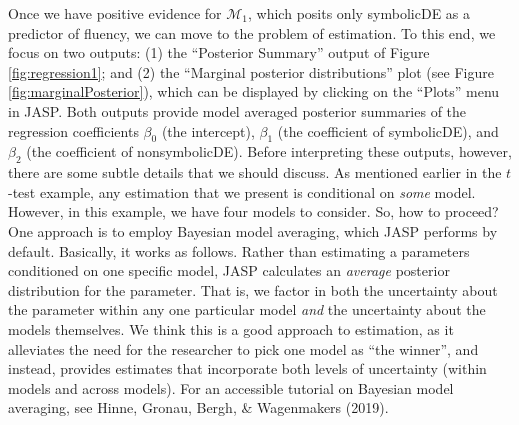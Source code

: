 \documentclass[english,,doc,floatsintext]{apa6}
\begin{document}
Once we have positive evidence for \(\mathcal{M}_{1}\), which posits only symbolicDE as a predictor of fluency, we can move to the problem of estimation. To this end, we focus on two outputs: (1) the \enquote{Posterior Summary} output of Figure \ref{fig:regression1}; and (2) the \enquote{Marginal posterior distributions} plot (see Figure \ref{fig:marginalPosterior}), which can be displayed by clicking on the \enquote{Plots} menu in JASP. Both outputs provide model averaged posterior summaries of the regression coefficients \(\beta_{0}\) (the intercept), \(\beta_{1}\) (the coefficient of symbolicDE), and \(\beta_{2}\) (the coefficient of nonsymbolicDE). Before interpreting these outputs, however, there are some subtle details that we should discuss. As mentioned earlier in the \(t\)-test example, any estimation that we present is conditional on \emph{some} model. However, in this example, we have four models to consider. So, how to proceed? One approach is to employ Bayesian model averaging, which JASP performs by default. Basically, it works as follows. Rather than estimating a parameters conditioned on one specific model, JASP calculates an \emph{average} posterior distribution for the parameter. That is, we factor in both the uncertainty about the parameter within any one particular model \emph{and} the uncertainty about the models themselves. We think this is a good approach to estimation, as it alleviates the need for the researcher to pick one model as \enquote{the winner}, and instead, provides estimates that incorporate both levels of uncertainty (within models and across models). For an accessible tutorial on Bayesian model averaging, see Hinne, Gronau, Bergh, \& Wagenmakers (2019).
\end{document}

